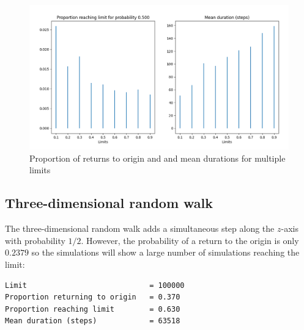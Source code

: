 \begin{figure}
\begin{center}
\includegraphics[width=\textwidth]{random-walk-02}
\caption{Proportion of returns to origin and and mean durations for multiple limits}\label{f.random-walk-2D}
\end{center}
\end{figure}

\newpage

\subsection{Three-dimensional random walk}

The three-dimensional random walk \cite{mos,mosteller} adds a simultaneous step along the $z$-axis with probability $1/2$. However, the probability of a return to the origin is only $0.2379$ so the simulations will show a large number of simulations reaching the limit:

\begin{verbatim}
Limit                            = 100000
Proportion returning to origin   = 0.370
Proportion reaching limit        = 0.630
Mean duration (steps)            = 63518
\end{verbatim}
